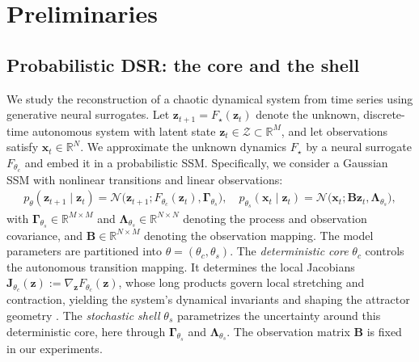 \documentclass{article}
\theoremstyle{plain}
\theoremstyle{definition}
\theoremstyle{remark}
\begin{document}
\section{Preliminaries}
\label{sec:prelim}

\subsection{Probabilistic DSR: the core and the shell}
\label{subsec:prelim_dsr}

We study the reconstruction of a chaotic dynamical system from time series using generative neural surrogates. Let $\bm z_{t+1}=F_\star(\bm z_t)$ denote the unknown, discrete-time autonomous system with latent state $\bm z_t\in\mathcal Z\subset\mathbb R^M$, and let observations satisfy $\bm x_t\in\mathbb R^N$. We approximate the unknown dynamics $F_\star$ by a neural surrogate $F_{\theta_c}$ and embed it in a probabilistic 
SSM. Specifically, we consider a Gaussian SSM with nonlinear transitions and linear observations: 
\begin{align*}
p_{\theta}(\bm z_{t+1}\mid \bm z_t) = \mathcal N\big(\bm z_{t+1}; F_{\theta_c}(\bm z_t),\bm\Gamma_{\theta_s}\big),
\quad p_{\theta_s}(\bm x_t\mid \bm z_t) = \mathcal N\big(\bm x_t;\bm B\bm z_t,\bm\Lambda_{\theta_s}\big),
\end{align*}
with $\bm\Gamma_{\theta_s} \in \mathbb{R}^{M \times M}$ and $\bm\Lambda_{\theta_s} \in \mathbb{R}^{N \times N}$ denoting the process and observation covariance, and $\bm B \in \mathbb{R}^{N \times M}$ denoting the observation mapping. The model parameters are partitioned into $\theta=(\theta_c,\theta_s)$. The \emph{deterministic core} $\theta_c$ controls the autonomous transition mapping. It determines the local Jacobians $\bm J_{\theta_c}(\bm z) := \nabla_{\bm z} F_{\theta_c}(\bm z)$, whose long products govern local stretching and contraction, yielding the system's dynamical invariants and shaping the attractor geometry \citep{eckmann1985ergodic}. The \emph{stochastic shell} $\theta_s$ parametrizes the uncertainty around this deterministic core, here through $\bm\Gamma_{\theta_s}$ and $\bm\Lambda_{\theta_s}$. The observation matrix $\bm B$ is fixed in our experiments.
\end{document}
